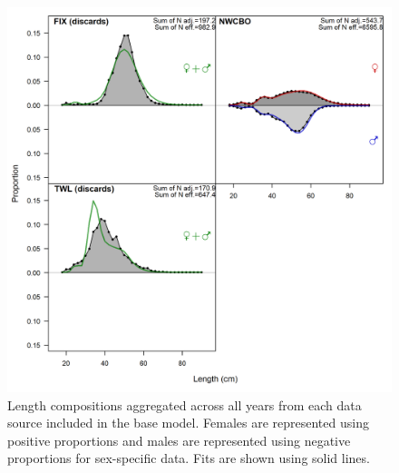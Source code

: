 \documentclass[11pt,
  english,
  a4paper,
]{article}
\begin{document}
\begin{figure}
\centering
\includegraphics[width=1\textwidth,height=1\textheight]{figs/comp_lenfit__aggregated_across_time.png}
\caption{Length compositions aggregated across all years from each data source included in the base model. Females are represented using positive proportions and males are represented using negative proportions for sex-specific data. Fits are shown using solid lines. \label{fig:comp_lenfit_8}}
\end{figure}

\tagmcend\tagstructend

\end{document}
